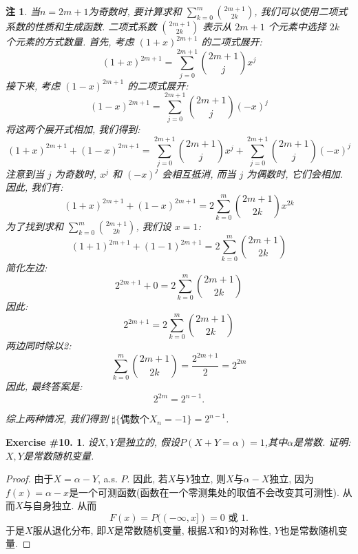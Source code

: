 \documentclass[UTF8, a4paper]{article}
\newtheorem{exercise}{Exercise \#10.}
\newtheorem*{remark}{注}
\begin{document}
\begin{remark}
当\(n = 2m+1\)为奇数时, 
要计算求和 \(\sum_{k = 0}^{m} \binom{2m+1}{2k}\), 我们可以使用二项式系数的性质和生成函数. 二项式系数 \(\binom{2m+1}{2k}\) 表示从 \(2m+1\) 个元素中选择 \(2k\) 个元素的方式数量. 
首先, 考虑 \((1 + x)^{2m+1}\) 的二项式展开:
\[
(1 + x)^{2m+1} = \sum_{j=0}^{2m+1} \binom{2m+1}{j} x^j
\]
接下来, 考虑 \((1 - x)^{2m+1}\) 的二项式展开:
\[
(1 - x)^{2m+1} = \sum_{j=0}^{2m+1} \binom{2m+1}{j} (-x)^j
\]
将这两个展开式相加, 我们得到:
\[
(1 + x)^{2m+1} + (1 - x)^{2m+1} = \sum_{j=0}^{2m+1} \binom{2m+1}{j} x^j + \sum_{j=0}^{2m+1} \binom{2m+1}{j} (-x)^j
\]
注意到当 \(j\) 为奇数时, \(x^j\) 和 \((-x)^j\) 会相互抵消, 而当 \(j\) 为偶数时, 它们会相加. 因此, 我们有:
\[
(1 + x)^{2m+1} + (1 - x)^{2m+1} = 2 \sum_{k=0}^{m} \binom{2m+1}{2k} x^{2k}
\]
为了找到求和 \(\sum_{k=0}^{m} \binom{2m+1}{2k}\), 我们设 \(x = 1\):
\[
(1 + 1)^{2m+1} + (1 - 1)^{2m+1} = 2 \sum_{k=0}^{m} \binom{2m+1}{2k}
\]
简化左边:
\[
2^{2m+1} + 0 = 2 \sum_{k=0}^{m} \binom{2m+1}{2k}
\]
因此:
\[
2^{2m+1} = 2 \sum_{k=0}^{m} \binom{2m+1}{2k}
\]
两边同时除以2:
\[
\sum_{k=0}^{m} \binom{2m+1}{2k} = \frac{2^{2m+1}}{2} = 2^{2m}
\]
因此, 最终答案是:
\[
\boxed{2^{2m}} = 2^{n-1}.
\]

综上两种情况, 我们得到 \(\sharp\{\text{偶数个} X_n = -1\} = 2^{n-1}\).


\end{remark}


\begin{framed}
\begin{exercise}
设\(X, Y\)是独立的, 假设\(P(X+Y = \alpha) = 1\),其中\(\alpha\)是常数.
证明: \(X, Y\)是常数随机变量.
\end{exercise}
\end{framed}


\begin{proof}
由于\(X = \alpha - Y\), a.s. \(P\). 因此, 若\(X\)与\(Y\)独立, 则\(X\)与\(\alpha - X\)独立, 因为\(f(x) = \alpha - x\)是一个可测函数(函数在一个零测集处的取值不会改变其可测性).
从而\(X\)与自身独立. 从而
$$
F(x) = P((-\infty, x]) = 0 \text{ 或 } 1.
$$
于是\(X\)服从退化分布, 即\(X\)是常数随机变量, 根据\(X\)和\(Y\)的对称性, \(Y\)也是常数随机变量.
\end{proof}


\end{document}
